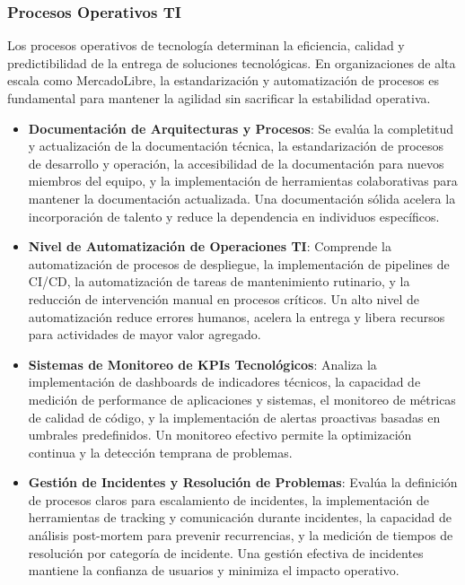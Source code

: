 \subsubsection{Procesos Operativos TI}

Los procesos operativos de tecnología determinan la eficiencia, calidad y predictibilidad de la entrega de soluciones tecnológicas. En organizaciones de alta escala como MercadoLibre, la estandarización y automatización de procesos es fundamental para mantener la agilidad sin sacrificar la estabilidad operativa.

\begin{itemize}
\item \textbf{Documentación de Arquitecturas y Procesos}: Se evalúa la completitud y actualización de la documentación técnica, la estandarización de procesos de desarrollo y operación, la accesibilidad de la documentación para nuevos miembros del equipo, y la implementación de herramientas colaborativas para mantener la documentación actualizada. Una documentación sólida acelera la incorporación de talento y reduce la dependencia en individuos específicos.

\item \textbf{Nivel de Automatización de Operaciones TI}: Comprende la automatización de procesos de despliegue, la implementación de pipelines de CI/CD, la automatización de tareas de mantenimiento rutinario, y la reducción de intervención manual en procesos críticos. Un alto nivel de automatización reduce errores humanos, acelera la entrega y libera recursos para actividades de mayor valor agregado.

\item \textbf{Sistemas de Monitoreo de KPIs Tecnológicos}: Analiza la implementación de dashboards de indicadores técnicos, la capacidad de medición de performance de aplicaciones y sistemas, el monitoreo de métricas de calidad de código, y la implementación de alertas proactivas basadas en umbrales predefinidos. Un monitoreo efectivo permite la optimización continua y la detección temprana de problemas.

\item \textbf{Gestión de Incidentes y Resolución de Problemas}: Evalúa la definición de procesos claros para escalamiento de incidentes, la implementación de herramientas de tracking y comunicación durante incidentes, la capacidad de análisis post-mortem para prevenir recurrencias, y la medición de tiempos de resolución por categoría de incidente. Una gestión efectiva de incidentes mantiene la confianza de usuarios y minimiza el impacto operativo.
\end{itemize}

